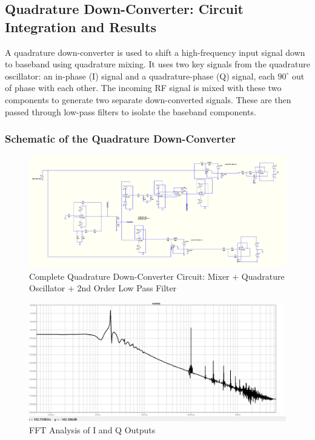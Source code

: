 \subsection{Quadrature Down-Converter: Circuit Integration and Results}

A quadrature down-converter is used to shift a high-frequency input signal down to baseband using quadrature mixing. It uses two key signals from the quadrature oscillator: an in-phase (I) signal and a quadrature-phase (Q) signal, each $90^\circ$ out of phase with each other. The incoming RF signal is mixed with these two components to generate two separate down-converted signals. These are then passed through low-pass filters to isolate the baseband components.

\subsubsection{Schematic of the Quadrature Down-Converter}

\begin{figure}[H]
    \centering
    \includegraphics[width=1\linewidth]{sec/sch.png}
    \caption{Complete Quadrature Down-Converter Circuit: Mixer + Quadrature Oscillator + 2nd Order Low Pass Filter}
    \label{fig:quad-downconv-schematic}
\end{figure}
\begin{figure}[H]
    \centering
    \includegraphics[width=0.95\linewidth]{sec/ffts.png}
    \caption{FFT Analysis of I and Q Outputs}
    \label{fig:fft-analysis}
\end{figure}

